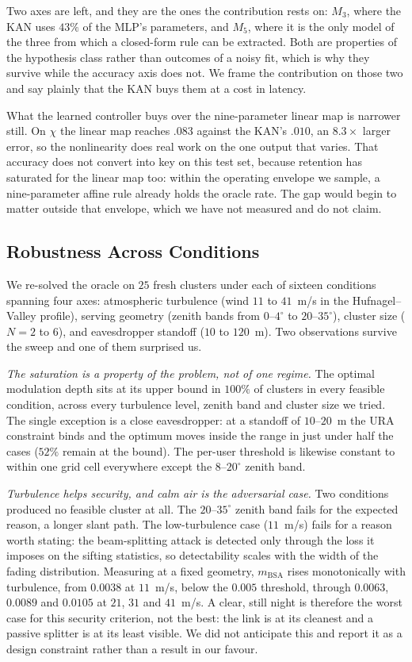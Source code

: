 Two axes are left, and they are the ones the contribution rests on: $M_3$, where the KAN
uses $43\%$ of the MLP's parameters, and $M_5$, where it is the only model of the three
from which a closed-form rule can be extracted. Both are properties of the hypothesis class
rather than outcomes of a noisy fit, which is why they survive while the accuracy axis does
not. We frame the contribution on those two and say plainly that the KAN buys them at a cost
in latency.

What the learned controller buys over the nine-parameter linear map is narrower still. On
$\chi$ the linear map reaches $.083$ against the KAN's $.010$, an $8.3\times$ larger error,
so the nonlinearity does real work on the one output that varies. That accuracy does not
convert into key on this test set, because retention has saturated for the linear map too:
within the operating envelope we sample, a nine-parameter affine rule already holds the
oracle rate. The gap would begin to matter outside that envelope, which we have not
measured and do not claim.

\subsection{Robustness Across Conditions}\label{sec:results:robust}
We re-solved the oracle on $25$ fresh clusters under each of sixteen conditions spanning four
axes: atmospheric turbulence (wind $11$ to $41$~m/s in the Hufnagel--Valley profile), serving
geometry (zenith bands from $0$--$4^\circ$ to $20$--$35^\circ$), cluster size ($N{=}2$ to $6$),
and eavesdropper standoff ($10$ to $120$~m). Two observations survive the sweep and one of them
surprised us.

\emph{The saturation is a property of the problem, not of one regime.} The optimal modulation
depth sits at its upper bound in $100\%$ of clusters in every feasible condition, across every
turbulence level, zenith band and cluster size we tried. The single exception is a close
eavesdropper: at a standoff of $10$--$20$~m the URA constraint binds and the optimum moves
inside the range in just under half the cases ($52\%$ remain at the bound). The per-user
threshold is likewise constant to within one grid cell everywhere except the $8$--$20^\circ$
zenith band.

\emph{Turbulence helps security, and calm air is the adversarial case.} Two conditions produced
no feasible cluster at all. The $20$--$35^\circ$ zenith band fails for the expected reason, a
longer slant path. The low-turbulence case ($11$~m/s) fails for a reason worth stating: the
beam-splitting attack is detected only through the loss it imposes on the sifting statistics,
so detectability scales with the width of the fading distribution. Measuring at a fixed
geometry, $m_{\mathrm{BSA}}$ rises monotonically with turbulence, from $0.0038$ at $11$~m/s,
below the $0.005$ threshold, through $0.0063$, $0.0089$ and $0.0105$ at $21$, $31$ and
$41$~m/s. A clear, still night is therefore the worst case for this security criterion, not the
best: the link is at its cleanest and a passive splitter is at its least visible. We did not
anticipate this and report it as a design constraint rather than a result in our favour.

